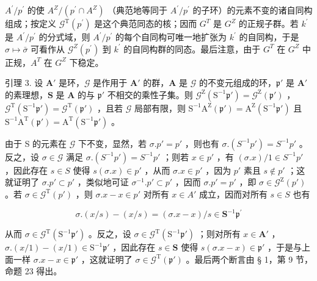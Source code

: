 \(A^{\prime}/p^{\prime}\) 的使 \(A^{Z}/(p^{\prime} \cap A^{Z})\) （典范地等同于 \(A^{\prime}/p^{\prime}\) 的子环）的元素不变的诸自同构组成；按定义 \(\mathcal{G}^{\mathrm{T}}(p^{\prime})\) 是这个典范同态的核；因而 \(G^{T}\) 是 \(G^{Z}\) 的正规子群。若 \(k^{\prime}\) 是 \(A^{\prime}/p^{\prime}\) 的分式域，则 \(A^{\prime}/p^{\prime}\) 的每个自同构可唯一地扩张为 \(k^{\prime}\) 的自同构，于是 \(\sigma \mapsto \bar{\sigma}\) 可看作从 \(\mathcal{G}^{Z}(p^{\prime})\) 到 \(k^{\prime}\) 的自同构群的同态。最后注意，由于 \(G^{T}\) 在 \(G^{Z}\) 中正规，\(A^{T}\) 在 \(G^{Z}\) 下稳定。

引理 3. 设 \(\mathbf{A}'\) 是环，\(\mathcal{G}\) 是作用于 \(\mathbf{A}'\) 的群，\(\mathbf{A}\) 是 \(\mathcal{G}\) 的不变元组成的环，\(\mathfrak{p}'\) 是 \(\mathbf{A}'\) 的素理想，\(\mathbf{S}\) 是 \(\mathbf{A}\) 的与 \(\mathfrak{p}'\) 不相交的乘性子集。则 \(\mathcal{G}^{\mathrm{Z}}(\mathrm{S}^{-1}\mathfrak{p}') = \mathcal{G}^{\mathrm{Z}}(\mathfrak{p}')\) ，\(\mathcal{G}^{\mathrm{T}}(\mathrm{S}^{-1}\mathfrak{p}') = \mathcal{G}^{\mathrm{T}}(\mathfrak{p}')\) ，且若 \(\mathcal{G}\) 局部有限，则 \(\mathrm{S}^{-1}\mathrm{A}^{\mathrm{Z}}(\mathfrak{p}') = \mathrm{A}^{\mathrm{Z}}(\mathrm{S}^{-1}\mathfrak{p}')\) 且 \(\mathrm{S}^{-1}\mathrm{A}^{\mathrm{T}}(\mathfrak{p}') = \mathrm{A}^{\mathrm{T}}(\mathrm{S}^{-1}\mathfrak{p}')\) 。

由于 S 的元素在 \(\mathcal{G}\) 下不变，显然，若 \(\sigma. p' = p'\) ，则也有 \(\sigma. (S^{-1}p') = S^{-1}p'\) 。反之，设 \(\sigma \in \mathcal{G}\) 满足 \(\sigma. (S^{-1}p') = S^{-1}p'\) ；则若 \(x \in p'\) ，有 \((\sigma.x)/1 \in S^{-1}p'\) ，因此存在 \(s \in S\) 使得 \(s(\sigma.x) \in p'\) ，从而 \(\sigma.x \in p'\) ，因为 \(p'\) 素且 \(s \notin p'\) ；这就证明了 \(\sigma. p' \subset p'\) ，类似地可证 \(\sigma^{-1}. p' \subset p'\) ，因而 \(\sigma. p' = p'\) ，即 \(\sigma \in \mathcal{G}^{\mathrm{Z}}(p')\) 。若 \(\sigma \in \mathcal{G}^{\mathrm{T}}(p')\) ，则 \(\sigma.x - x \in p'\) 对所有 \(x \in A'\) 成立，因而对所有 \(s \in S\) 也有

\[
\sigma . (x / s) - (x / s) = (\sigma . x - x) / s \in \mathbf {S} ^ {- 1} \mathfrak {p} ^ {\prime}
\]

从而 \(\sigma \in \mathcal{G}^{\mathrm{T}}(\mathrm{S}^{-1}\mathfrak{p}')\) 。反之，设 \(\sigma \in \mathcal{G}^{\mathrm{T}}(\mathrm{S}^{-1}\mathfrak{p}')\) ；则对所有 \(x \in \mathbf{A}'\) ，\(\sigma.(x/1) - (x/1) \in \mathrm{S}^{-1}\mathfrak{p}'\) ，因此存在 \(s \in \mathbf{S}\) 使得 \(s(\sigma.x - x) \in \mathfrak{p}'\) ，于是与上面一样 \(\sigma.x - x \in \mathfrak{p}'\) ，这就证明了 \(\sigma \in \mathcal{G}^{\mathrm{T}}(\mathfrak{p}')\) 。最后两个断言由 § 1，第 9 节，命题 23 得出。

